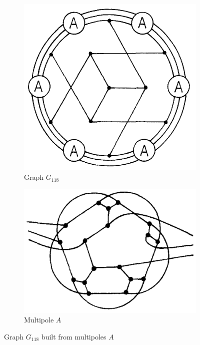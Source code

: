 \documentclass[12pt, twoside]{book}
\begin{document}
\begin{example}
	\begin{figure}
		\centering
		\begin{subfigure}[b]{0.45\textwidth}
			\centering
			\includegraphics[width=\textwidth]{images/Kochol-article/Kochol-final-graph}
			\caption{Graph $G_{118}$}
			\label{fig:Kochol-final-graph-G118}
		\end{subfigure}
		\hfill
		\begin{subfigure}[b]{0.45\textwidth}
			\centering
			\includegraphics[width=\textwidth]{images/Kochol-article/Kochol-multipole-A}
			\caption{Multipole $A$}
			\label{fig:Kochol-multipole-A}
		\end{subfigure}
		\caption{\cite{Kochol1996} Graph $G_{118}$ built from multipoles $A$}
	\end{figure}
	

\end{example}
\end{document}
